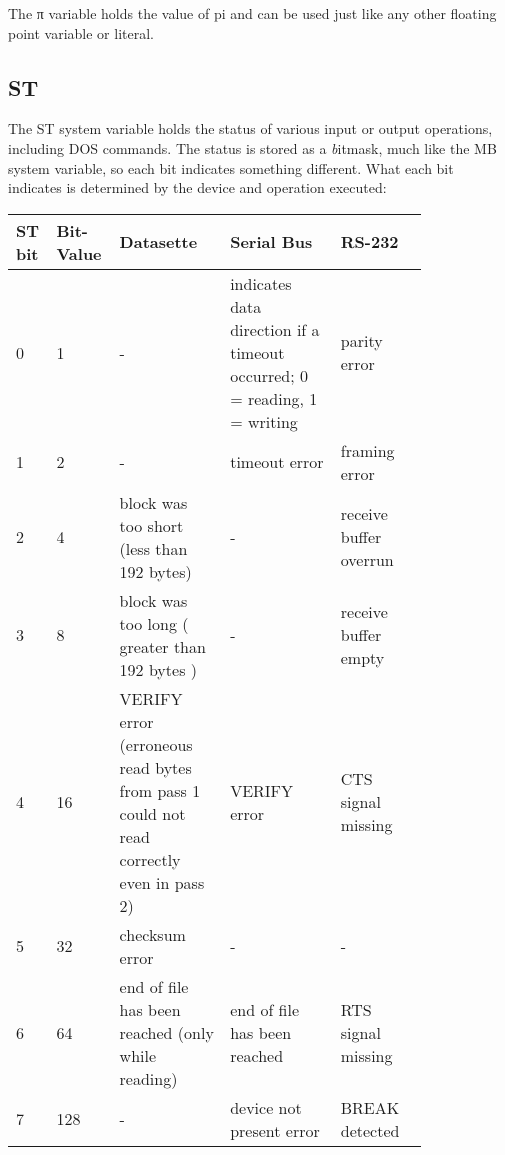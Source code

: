 The {\ttfamily π} variable holds the value of pi and can be used just like any
other floating point variable or literal.\\


\subsection{ST}

The {\ttfamily ST} system variable holds the status of various input or output
operations, including DOS commands.  The status is stored as a {\emph bitmask},
much like the {\ttfamily MB} system variable, so each bit indicates something
different.  What each bit indicates is determined by the device and operation
executed:\\

\begin{tabular}{|p{0.05\linewidth}|p{0.07\linewidth}|p{0.25\linewidth}|p{0.25\linewidth}|p{0.2\linewidth}|}
	\hline

	{\bfseries ST bit} & {\bfseries Bit-Value} & {\bfseries Datasette} &
	{\bfseries Serial Bus} & {\bfseries RS-232}\\ \hline

	0 & 1 & - & indicates data direction if a timeout occurred; 0 = reading, 1
	= writing & parity error\\ \hline

	1 & 2 & - & timeout error & framing error\\ \hline

	2 & 4 & block was too short (less than 192 bytes) & - & receive buffer overrun\\ \hline

	3 & 8 &  block was too long ( greater than 192 bytes )& - & receive buffer empty\\ \hline

	4 & 16 & {\ttfamily VERIFY} error (erroneous read bytes from pass 1 could
	not read correctly even in pass 2) & {\ttfamily VERIFY} error & CTS signal
	missing\\ \hline

	5 & 32 & checksum error & - & -\\ \hline

	6 & 64 & end of file has been reached (only while reading) & end of file
	has been reached & RTS signal missing\\ \hline

	7 & 128 & - & device not present error & BREAK detected\\ \hline

\end{tabular}

